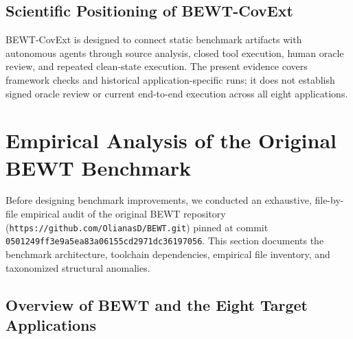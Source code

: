 \documentclass[pdflatex,sn-mathphys-num]{sn-jnl}
\begin{document}
\subsection{Scientific Positioning of BEWT-CovExt}

BEWT-CovExt is designed to connect static benchmark artifacts with autonomous agents through source analysis, closed tool execution, human oracle review, and repeated clean-state execution. The present evidence covers framework checks and historical application-specific runs; it does not establish signed oracle review or current end-to-end execution across all eight applications.


\section{Empirical Analysis of the Original BEWT Benchmark}\label{sec:bewt-analysis}

Before designing benchmark improvements, we conducted an exhaustive, file-by-file empirical audit of the original BEWT repository (\texttt{https://github.com/OlianasD/BEWT.git}) pinned at commit \texttt{0501249ff3e9a5ea83a06155cd2971dc36197056}. This section documents the benchmark architecture, toolchain dependencies, empirical file inventory, and taxonomized structural anomalies.

\subsection{Overview of BEWT and the Eight Target Applications}
\end{document}
